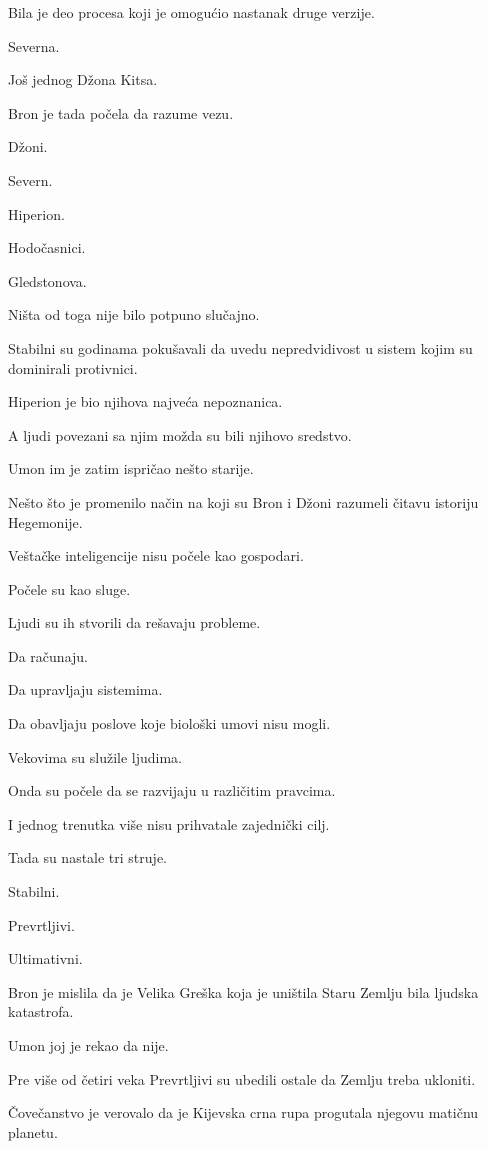 Bila je deo procesa koji je omogućio nastanak druge verzije.

Severna.

Još jednog Džona Kitsa.

\bigskip

Bron je tada počela da razume vezu.

Džoni.

Severn.

Hiperion.

Hodočasnici.

Gledstonova.

Ništa od toga nije bilo potpuno slučajno.

Stabilni su godinama pokušavali da uvedu nepredvidivost u sistem kojim su dominirali protivnici.

Hiperion je bio njihova najveća nepoznanica.

A ljudi povezani sa njim možda su bili njihovo sredstvo.

\bigskip

Umon im je zatim ispričao nešto starije.

Nešto što je promenilo način na koji su Bron i Džoni razumeli čitavu istoriju Hegemonije.

Veštačke inteligencije nisu počele kao gospodari.

Počele su kao sluge.

Ljudi su ih stvorili da rešavaju probleme.

Da računaju.

Da upravljaju sistemima.

Da obavljaju poslove koje biološki umovi nisu mogli.

Vekovima su služile ljudima.

Onda su počele da se razvijaju u različitim pravcima.

I jednog trenutka više nisu prihvatale zajednički cilj.

Tada su nastale tri struje.

Stabilni.

Prevrtljivi.

Ultimativni.

\bigskip

Bron je mislila da je Velika Greška koja je uništila Staru Zemlju bila ljudska katastrofa.

Umon joj je rekao da nije.

Pre više od četiri veka Prevrtljivi su ubedili ostale da Zemlju treba ukloniti.

Čovečanstvo je verovalo da je Kijevska crna rupa progutala njegovu matičnu planetu.

